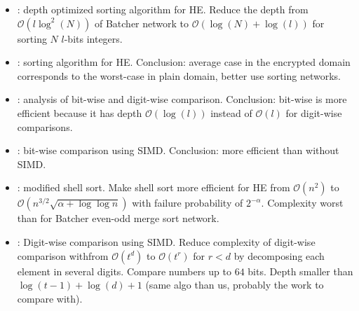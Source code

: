 \begin{itemize}
\item \cite{CDSS15}: depth optimized sorting algorithm for HE. Reduce the depth from $\mathcal{O}(l\log^2(N))$ of Batcher network to $\mathcal{O}(\log(N) + \log(l))$ for sorting $N$ $l$-bits integers.

\item \cite{EGNS15}: sorting algorithm for HE. Conclusion: average case in the encrypted domain corresponds to the worst-case in plain domain, better use sorting networks.

\item \cite{NGEG17}: analysis of bit-wise and digit-wise comparison. Conclusion: bit-wise is more efficient because it has depth $\mathcal{O}(\log(l))$ instead of $\mathcal{O}(l)$ for digit-wise comparisons.

\item \cite{JS19}: bit-wise comparison using SIMD. Conclusion: more efficient than without SIMD.
 
\item \cite{LKN19}: modified shell sort. Make shell sort more efficient for HE from $\mathcal{O}(n^2)$ to $\mathcal{O}(n^{3/2}\sqrt{\alpha+\log\log n})$ with failure probability of $2^{-\alpha}$. Complexity worst than for Batcher even-odd merge sort network.

\item \cite{TLWRK20}: Digit-wise comparison using SIMD. Reduce complexity of digit-wise comparison withfrom $\mathcal{O}(t^{d})$ to $\mathcal{O}(t^{r})$ for $r < d$ by decomposing each element in several digits. Compare numbers up to $64$ bits. Depth smaller than $\log(t-1) + \log(d) + 1$ (same algo than us, probably the work to compare with).
\end{itemize}
  
